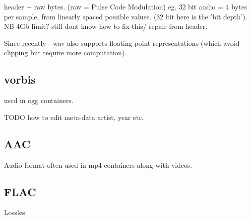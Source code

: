 \documentclass[oneside,english]{scrbook}
\begin{document}
header + raw bytes. (raw = Pulse Code Modulation) eg. 32 bit audio = 4 bytes per sample, from linearly spaced possible values. (32 bit here is the 'bit depth').
NB 4Gb limit? still dont know how to fix this/ repair from header.

Since recently - wav also supports floating point representations (which avoid clipping but require more computation).

\subsection{vorbis}
used in ogg containers.

TODO how to edit meta-data artist, year etc.

\subsection{AAC}
Audio format often used in mp4 containers along with videos.

\subsection{FLAC}
Lossles.
\end{document}
